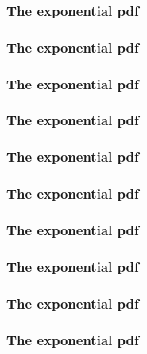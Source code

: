 \begin{frame}[fragile]\frametitle{The exponential pdf}


\end{frame}
\begin{frame}[fragile]\frametitle{The exponential pdf}


\end{frame}
\begin{frame}[fragile]\frametitle{The exponential pdf}


\end{frame}
\begin{frame}[fragile]\frametitle{The exponential pdf}


\end{frame}
\begin{frame}[fragile]\frametitle{The exponential pdf}


\end{frame}
\begin{frame}[fragile]\frametitle{The exponential pdf}


\end{frame}
\begin{frame}[fragile]\frametitle{The exponential pdf}


\end{frame}
\begin{frame}[fragile]\frametitle{The exponential pdf}


\end{frame}
\begin{frame}[fragile]\frametitle{The exponential pdf}


\end{frame}
\begin{frame}[fragile]\frametitle{The exponential pdf}


\end{frame}

